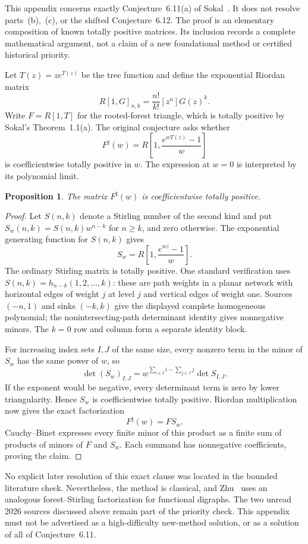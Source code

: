 \documentclass[11pt,a4paper]{article}
\newtheorem{proposition}[theorem]{Proposition}
\theoremstyle{definition}
\theoremstyle{remark}
\numberwithin{equation}{section}
\begin{document}
This appendix concerns exactly Conjecture~6.11(a) of
Sokal~\cite{Sokal2022}. It does not resolve parts~(b),~(c), or the shifted
Conjecture~6.12. The proof is an elementary composition of known totally
positive matrices. Its inclusion records a complete mathematical argument,
not a claim of a new foundational method or certified historical priority.

Let $T(z)=ze^{T(z)}$ be the tree function and define the exponential
Riordan matrix
\[
 R[1,G]_{n,k}=\frac{n!}{k!}[z^n]G(z)^k.
\]
Write $F=R[1,T]$ for the rooted-forest triangle, which is totally positive
by Sokal's Theorem~1.1(a). The original conjecture asks whether
\[
 F^{\sharp}(w)=R\left[1,\frac{e^{wT(z)}-1}{w}\right]
\]
is coefficientwise totally positive in $w$. The expression at $w=0$ is
interpreted by its polynomial limit.

\begin{proposition}
The matrix $F^{\sharp}(w)$ is coefficientwise totally positive.
\end{proposition}
\begin{proof}
Let $S(n,k)$ denote a Stirling number of the second kind and put
$S_w(n,k)=S(n,k)w^{n-k}$ for $n\ge k$, and zero otherwise.
The exponential generating function for $S(n,k)$ gives
\[
 S_w=R\left[1,\frac{e^{wz}-1}{w}\right].
\]
The ordinary Stirling matrix is totally positive. One standard verification
uses $S(n,k)=h_{n-k}(1,2,\ldots,k)$: these are path weights in a planar
network with horizontal edges of weight $j$ at level $j$ and vertical
edges of weight one. Sources $(-n,1)$ and sinks $(-k,k)$ give the displayed
complete homogeneous polynomial; the nonintersecting-path determinant
identity gives nonnegative minors. The $k=0$ row and column form a separate
identity block.

For increasing index sets $I,J$ of the same size, every nonzero term in
the minor of $S_w$ has the same power of $w$, so
\[
 \det (S_w)_{I,J}
 =w^{\sum_{i\in I}i-\sum_{j\in J}j}\det S_{I,J}.
\]
If the exponent would be negative, every determinant term is zero by
lower triangularity. Hence $S_w$ is coefficientwise totally positive.
Riordan multiplication now gives the exact factorization
\[
 F^{\sharp}(w)=F S_w.
\]
Cauchy--Binet expresses every finite minor of this product as a finite
sum of products of minors of $F$ and $S_w$. Each summand has nonnegative
coefficients, proving the claim.
\end{proof}

No explicit later resolution of this exact clause was located in the
bounded literature check. Nevertheless, the method is classical, and
Zhu~\cite{Zhu2024} uses an analogous forest--Stirling factorization for
functional digraphs. The two unread 2026 sources discussed above remain
part of the priority check. This appendix must not be advertised as a
high-difficulty new-method solution, or as a solution of all of
Conjecture~6.11.
\end{document}
